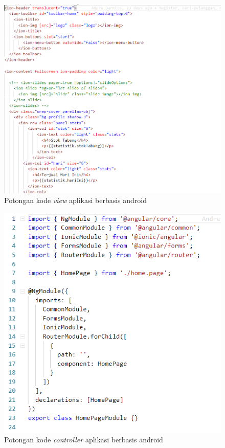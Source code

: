 \begin{enumerate}[a.]
		\begin{figure}[H]
			\center
			\includegraphics [width = 12cm]{gambar/kode/view-mobile}
			\caption{Potongan kode \textit{view} aplikasi berbasis android}
			\label{viewMobile}
		\end{figure}
		
		\begin{figure}[H]
			\center
			\includegraphics [width = 12cm]{gambar/kode/controller-mobile}
			\caption{Potongan kode \textit{controller} aplikasi berbasis android}
			\label{controllerMobile}
		\end{figure}
		

\end{enumerate}
